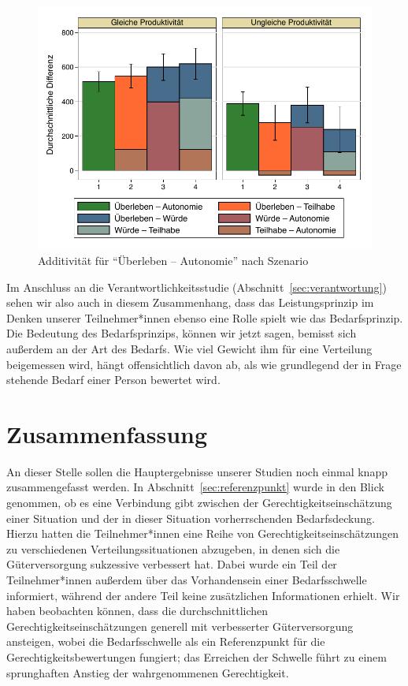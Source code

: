 \documentclass[justified,nobib,symmetric,twoside]{tufte-handout}
\begin{document}
\begin{figure}[t]\label{fig:abbildung_18}
   \center
   \caption{Additivität für \enquote{Überleben -- Autonomie} nach Szenario}
   \includegraphics[width=0.99\linewidth]{figure_18.pdf}
\end{figure}

Im Anschluss an die Verantwortlichkeitsstudie (Abschnitt~\ref{sec:verantwortung}) sehen wir also auch in diesem Zusammenhang, dass das Leistungsprinzip im Denken unserer Teilnehmer*innen ebenso eine Rolle spielt wie das Bedarfsprinzip.
Die Bedeutung des Bedarfsprinzips, können wir jetzt sagen, bemisst sich außerdem an der Art des Bedarfs.
Wie viel Gewicht ihm für eine Verteilung beigemessen wird, hängt offensichtlich davon ab, als wie grundlegend der in Frage stehende Bedarf einer Person bewertet wird.


\section{Zusammenfassung}\label{sec:zusammenfassung}
An dieser Stelle sollen die Hauptergebnisse unserer Studien noch einmal knapp zusammengefasst werden.
In Abschnitt~\ref{sec:referenzpunkt} wurde in den Blick genommen, ob es eine Verbindung gibt zwischen der Gerechtigkeitseinschätzung einer Situation und der in dieser Situation vorherrschenden Bedarfsdeckung.
Hierzu hatten die Teilnehmer*innen eine Reihe von Gerechtigkeitseinschätzungen zu verschiedenen Verteilungssituationen abzugeben, in denen sich die Güterversorgung sukzessive verbessert hat.
Dabei wurde ein Teil der Teilnehmer*innen außerdem über das Vorhandensein einer Bedarfsschwelle informiert, während der andere Teil keine zusätzlichen Informationen erhielt.
Wir haben beobachten können, dass die durchschnittlichen Gerechtigkeitseinschätzungen generell mit verbesserter Güterversorgung ansteigen, wobei die Bedarfsschwelle als ein Referenzpunkt für die Gerechtigkeitsbewertungen fungiert; das Erreichen der Schwelle führt zu einem sprunghaften Anstieg der wahrgenommenen Gerechtigkeit.
\end{document}
